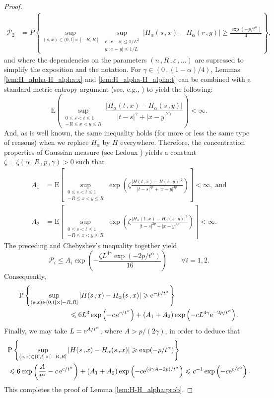 \documentclass[reqno]{amsart}
\newcommand{\<}{\langle}
\renewcommand{\>}{\rangle}
\renewcommand{\P}{\mathrm{P}}
\newcommand{\E}{\mathrm{E}}
\newcommand{\1}{\mathbb{1}}
\newcommand{\e}{{\rm e}}
\renewcommand{\ge}{\geqslant}
\renewcommand{\le}{\leqslant}
\theoremstyle{definition}
\numberwithin{equation}{section}
\begin{document}
\begin{proof}
\begin{align*}
		\mathscr{P}_2 &=P\left\{ \sup_{(s,x)\in (0,t] \times[-R,R]}
    			\sup_{\substack{r:|r-s|\le 1/L^2\\
			y:|x-y|\le 1/L}} |H_\alpha(s\,,x)-H_\alpha(r\,,y)| \ge \frac{\exp(-p/t^\alpha)}{4}\right\},
	\end{align*}
	and where the dependencies on the parameters $(n\,,R\,,\varepsilon\,,\ldots)$ are supressed 
	to simplify the exposition and the notation.
	For $\gamma \in (0\,, (1-\alpha)/4)$, 
	Lemmas \ref{lem:H_alpha-H_alpha:x} and \ref{lem:H_alpha-H_alpha:t} can be combined with
	a standard metric entropy argument (see, e.g., \cite[Proposition A.1]{DKN07})
	to yield the following:
	\[
		\E\left(\sup_{\substack{0\le s<t\le1\\
		-R\le x<y\le R}} \frac{|H_\alpha(t\,,x)-H_\alpha(s\,,y)|}{|t-s|^\gamma+|x-y|^{2\gamma}}\right)<\infty.
	\]
	And, as is well known, the same inequality holds (for more or less the same type of reasons)
	when we replace $H_\alpha$ by $H$ everywhere. 
	Therefore, the concentration properties of Gaussian measure (see  Ledoux \cite{Ledoux}) yields
	a constant $\zeta=\zeta(\alpha\,,R\,,p\,,\gamma)>0$ such that
	\begin{equation}\label{A1A2}\begin{split}
		A_1&=\E\left[\sup_{\substack{0\le s<t\le1\\
			-R\le x<y\le R}} \exp\left(\zeta\frac{|H(t\,,x)-H(s\,,y)|^2}{
			|t-s|^{2p}+|x-y|^{4p}}\right)\right]<\infty,
			\text{ and}\\
		A_2&=\E\left[\sup_{\substack{0\le s<t\le1\\
			-R\le x<y\le R}} \exp\left(\zeta
			\frac{|H_\alpha(t\,,x)-H_\alpha(s\,,y)|^2}{
			|t-s|^{2p}+|x-y|^{4p}}\right)\right]<\infty.
	\end{split}\end{equation}
	The preceding and Chebyshev's inequality together yield
	\[
		\mathscr{P}_i \le A_i\exp\left( - \frac{\zeta L^{4\gamma}
		\exp(-2p/t^\alpha) }{16}\right)
		\qquad\forall i=1,2.
	\]
	Consequently,
	\begin{align*}
		&\P\left\{ \sup_{(s,x)\in (0,t] \times[-R,R]}
		|H(s\,,x)-H_\alpha(s\,,x)|\ge \e^{-p/t^\alpha} \right\}\\
		&\hskip1in\le 6 L^3\exp\left( - c\, \e^{c/t^\alpha}\right) + (A_1+A_2)
		\exp\left( - c L^{4\gamma} \e^{-2p/t^\alpha}\right).
	\end{align*}
	Finally, we may take $L = \e^{A/t^\alpha}$, where $A>p/(2\gamma)$, in order to deduce that
	\begin{align*}
		&\P\left\{ \sup_{(s,x)\in (0,t] \times[-R,R]}
			|H(s\,,x)-H_\alpha(s\,,x)|\ge \exp(-p/t^\alpha) \right\}\\
		&\le 6 \exp\left( \frac{A}{t^\alpha} - c\, \e^{c/t^\alpha}\right) + (A_1+A_2)
			\exp\left( - c \e^{(4\gamma A-2p)/t^\alpha}\right)
			\le c^{-1} \exp\left( -c \e^{c/t^\alpha}\right).
	\end{align*}
	This completes the proof of Lemma \ref{lem:H-H_alpha:prob}.
\end{proof}
\end{document}
